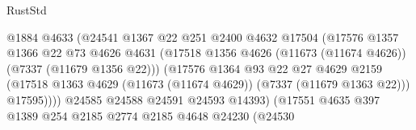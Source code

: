 \begin{lexlean}{RustStd}
\begin{coremodule}
                                          @1884
                                          @4633
                                          (@24541
                                            @1367
                                            @22
                                            @251
                                            @2400
                                            @4632
                                            @17504
                                            (@17576
                                              @1357
                                              @1366
                                              @22
                                              @73
                                              @4626
                                              @4631
                                              (@17518
                                                @1356
                                                @4626
                                                (@11673 (@11674 @4626))
                                                (@7337 (@11679 @1356 @22)))
                                              (@17576
                                                @1364
                                                @93
                                                @22
                                                @27
                                                @4629
                                                @2159
                                                (@17518
                                                  @1363
                                                  @4629
                                                  (@11673 (@11674 @4629))
                                                  (@7337 (@11679 @1363 @22)))
                                                @17595))))
                                        @24585
                                        @24588
                                        @24591
                                        @24593
                                        @14393)
                                      (@17551
                                        @4635
                                        @397
                                        @1389
                                        @254
                                        @2185
                                        @2774
                                        @2185
                                        @4648
                                        @24230
                                        (@24530

\end{coremodule}
\end{lexlean}
